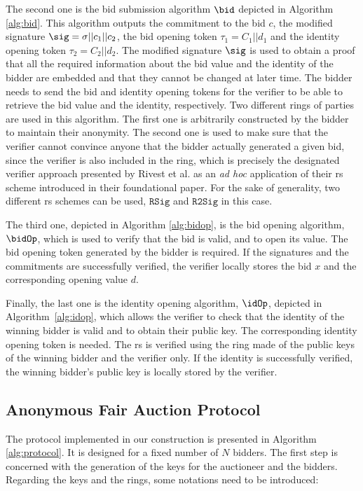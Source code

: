 

The second one is the bid submission algorithm $\bid$ depicted in Algorithm \ref{alg:bid}. This algorithm outputs the commitment to the bid $c$, the modified signature $\sig = \sigma || c_1 || c_2$, the bid opening token $\tau_1 = C_1 || d_1$ and the identity opening token $\tau_2 = C_2 || d_2$. The modified signature $\sig$ is used to obtain a proof that all the required information about the bid value and the identity of the bidder are embedded and that they cannot be changed at later time. The bidder needs to send the bid and identity opening tokens for the verifier to be able to retrieve the bid value and the identity, respectively. Two different rings of parties are used in this algorithm. The first one is arbitrarily constructed by the bidder to maintain their anonymity. The second one is used to make sure that the verifier cannot convince anyone that the bidder actually generated a given bid, since the verifier is also included in the ring, which is precisely the designated verifier approach presented by Rivest et al. as an \textit{ad hoc} application of their \gls{rs} scheme introduced in their foundational paper\cite{rivest2001leak}. For the sake of generality, two different \gls{rs} schemes can be used, $\mathtt{RSig}$ and $\mathtt{R2Sig}$ in this case.



The third one, depicted in Algorithm \ref{alg:bidop}, is the bid opening algorithm, $\bidOp$, which is used to verify that the bid is valid, and to open its value. The bid opening token generated by the bidder is required. If the signatures and the commitments are successfully verified, the verifier locally stores the
bid $x$ and the corresponding opening value $d$. 



Finally, the last one is the identity opening algorithm, $\idOp$, depicted in
Algorithm~\ref{alg:idop}, which allows the verifier to check that the identity of the
winning bidder is valid and to obtain their public key. The
corresponding identity opening token is needed. The \gls{rs} is verified using the ring made
of the public keys of the winning bidder and the verifier only. If the
identity is successfully verified, the winning bidder's public key is
locally stored by the verifier.



\subsection{Anonymous Fair Auction Protocol}

The protocol implemented in our construction is presented in Algorithm \ref{alg:protocol}. It is designed for a fixed number of $N$ bidders. The first step is concerned with the generation of the keys for the auctioneer and the bidders. Regarding the keys and the rings, some notations need to be introduced:

